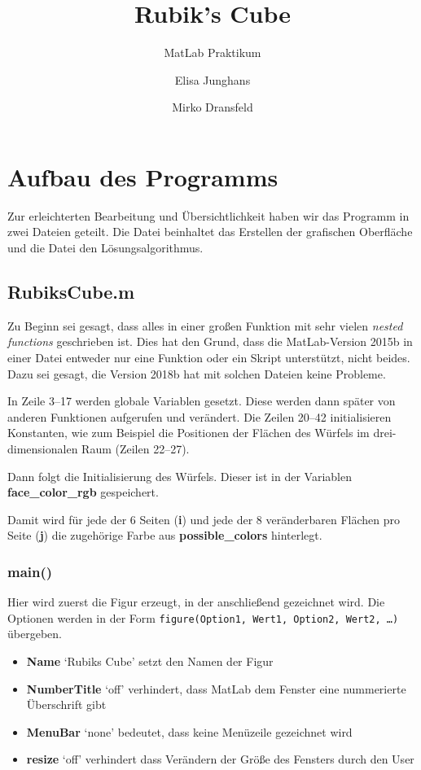 \documentclass[a4paper,12pt]{scrartcl}
\title{Rubik's Cube}
\subtitle{MatLab Praktikum}
\author{Elisa Junghans\and Mirko Dransfeld}
\date{}
\newcommand{\mcode}[3]{
  
}
\begin{document}
  \maketitle

  \section{Aufbau des Programms}
    Zur erleichterten Bearbeitung und Übersichtlichkeit haben wir das Programm in zwei Dateien geteilt. Die Datei \textbf{} beinhaltet das Erstellen der grafischen Oberfläche und die Datei \textbf{} den Lösungsalgorithmus.

    \subsection{RubiksCube.m}\label{sec:aufbau1}
      Zu Beginn sei gesagt, dass alles in einer großen Funktion mit sehr vielen \emph{nested functions} geschrieben ist. Dies hat den Grund, dass die MatLab-Version 2015b in einer Datei entweder nur eine Funktion oder ein Skript unterstützt, nicht beides. Dazu sei gesagt, die Version 2018b hat mit solchen Dateien keine Probleme.
      \newline

      In Zeile 3--17 werden globale Variablen gesetzt. Diese werden dann später von anderen Funktionen aufgerufen und verändert. Die Zeilen 20--42 initialisieren Konstanten, wie zum Beispiel die Positionen der Flächen des Würfels im drei-dimensionalen Raum (Zeilen 22--27).

      Dann folgt die Initialisierung des Würfels. Dieser ist in der Variablen \textbf{face\_color\_rgb} gespeichert.
      \mcode{44}{49}{RubiksCube}
      Damit wird für jede der 6 Seiten (\textbf{i}) und jede der 8 veränderbaren Flächen pro Seite (\textbf{j}) die zugehörige Farbe aus \textbf{possible\_colors} hinterlegt.

      \subsubsection{main()}\label{sec:main}
        Hier wird zuerst die Figur erzeugt, in der anschließend gezeichnet wird. Die Optionen werden in der Form \texttt{figure(Option1, Wert1, Option2, Wert2, \dots)} übergeben.
        \mcode{53}{53}{RubiksCube}
        \begin{itemize}
          \item{\textbf{Name}} `Rubiks Cube' setzt den Namen der Figur
          \item{\textbf{NumberTitle}} `off' verhindert, dass MatLab dem Fenster eine nummerierte Überschrift gibt
          \item{\textbf{MenuBar}} `none' bedeutet, dass keine Menüzeile gezeichnet wird
          \item{\textbf{resize}} `off' verhindert dass Verändern der Größe des Fensters durch den User
        \end{itemize}
\end{document}
